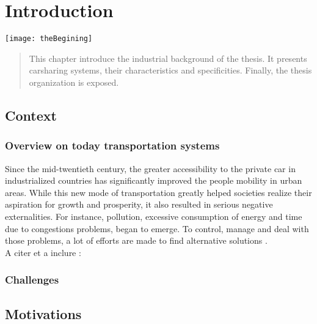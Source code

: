 \chapter{Introduction} \label{chap:introduction}
\begin{bibunit}[ieeetr]
\minitoc
\vspace{2cm}
%
\noindent
\begin{minipage}[c]{0.45\textwidth}
\texttt{[image: theBegining]}
\end{minipage}
\hfill
\begin{minipage}[c]{0.45\textwidth}
\begin{abstract}
This chapter introduce the industrial background of the thesis.
It presents carsharing systems, their characteristics and specificities.
Finally, the thesis organization is exposed.
\end{abstract}
\end{minipage}

\newpage
\section{Context}
\subsection{Overview on today transportation systems}
Since the mid-twentieth century, the greater accessibility to the private car in industrialized countries has significantly improved the people mobility in urban areas. 
While this new mode of transportation greatly helped societies realize their aspiration for growth and prosperity, it also resulted in serious negative externalities.
For instance, pollution, excessive consumption of energy and time due to congestions problems, began to emerge.
To control, manage and deal with those problems, a lot of efforts are made to find alternative solutions \cite{mitchell_reinventing_2010}.\\

A citer et a inclure : \cite{le_vine_carsharing_2014}

\subsection{Challenges}

\section{Motivations}


\end{bibunit}
